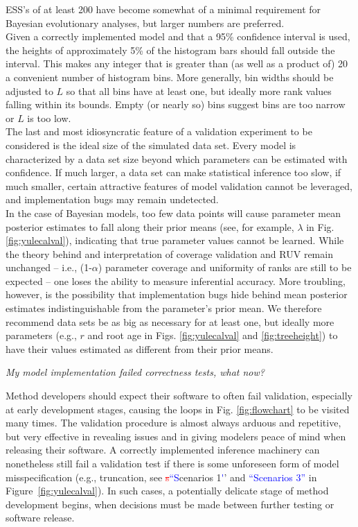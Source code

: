 \documentclass[oneside]{article}
\begin{document}
{ESS's of at least 200 have become somewhat of a minimal requirement for Bayesian evolutionary analyses, but larger numbers are preferred.\\
\indent Given a correctly implemented model and that a 95\% confidence interval is used, the heights of approximately 5\% of the histogram bars should fall outside the interval.
This makes any integer that is greater than (as well as a product of) 20 a convenient number of histogram bins.
More generally, bin widths should be adjusted to $L$ so that all bins have at least one, but ideally more rank values falling within its bounds.
Empty (or nearly so) bins suggest bins are too narrow or $L$ is too low.\\
\indent The last and most idiosyncratic feature of a validation experiment to be considered is the ideal size of the simulated data set.
Every model is characterized by a data set size beyond which parameters can be estimated with confidence.
If much larger, a data set can make statistical inference too slow, if much smaller, certain attractive features of model validation cannot be leveraged, and implementation bugs may remain undetected.\\
\indent In the case of Bayesian models, too few data points will cause parameter mean posterior estimates to fall along their prior means (see, for example, $\lambda$ in Fig. \ref{fig:yulecalval}), indicating that true parameter values cannot be learned.
While the theory behind and interpretation of coverage validation and RUV remain unchanged -- i.e., (1-$\alpha$) parameter coverage and uniformity of ranks are still to be expected -- one loses the ability to measure inferential accuracy.
More troubling, however, is the possibility that implementation bugs hide behind mean posterior estimates indistinguishable from the parameter's prior mean.
We therefore recommend data sets be as big as necessary for at least one, but ideally more parameters (e.g., $r$ and root age in Figs. \ref{fig:yulecalval} and \ref{fig:treeheight}) to have their values estimated as different from their prior means.}

\vspace{.25cm}

\noindent \emph{My model implementation failed correctness tests, what now?}

Method developers should expect their software to often fail validation, especially at early development stages, causing the loops in Fig. \ref{fig:flowchart} to be visited many times.
The validation procedure is almost always arduous and repetitive, but very effective in revealing issues and in giving modelers peace of mind when releasing their software.
A correctly implemented inference machinery can nonetheless still fail a validation test if there is some unforeseen form of model misspecification (e.g., truncation, see \textcolor{red}{\st{s}}\textcolor{blue}{``S}cenarios 1\textcolor{blue}'' and \textcolor{blue}{``Scenarios 3''} in Figure~\ref{fig:yulecalval}).
In such cases, a potentially delicate stage of method development begins, when decisions must be made between further testing or software release.
\end{document}
